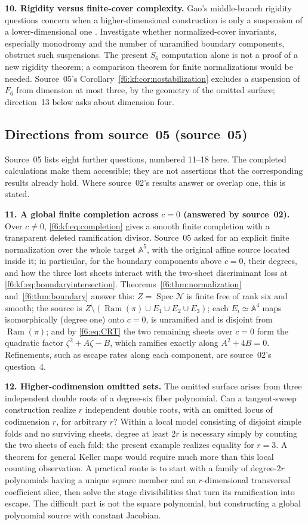 \documentclass[11pt,a4paper]{article}
\theoremstyle{definition}
\newcommand{\A}{\mathbb A}
\newcommand{\Spec}{\operatorname{Spec}}
\newcommand{\Ram}{\operatorname{Ram}}
\newcommand{\normal}{\mathcal N}
\newcommand{\src}[1]{\textup{(source~#1)}}
\begin{document}
\textbf{10. Rigidity versus finite-cover complexity.} Gao's middle-branch
rigidity questions concern when a higher-dimensional construction is
only a suspension of a lower-dimensional one \cite[\S4.5.2]{Gao}.
Investigate whether normalized-cover invariants, especially monodromy
and the number of unramified boundary components, obstruct such
suspensions. The present $S_6$ computation alone is not a proof of a
new rigidity theorem; a comparison theorem for finite normalizations
would be needed. Source~05's Corollary~\ref{f6:kf:cor:nostabilization}
excludes a suspension of $F_6$ from dimension at most three, by the
geometry of the omitted surface; direction~13 below asks about dimension
four.

\subsection{Directions from source~05 \src{05}}
\label{f6:kf:sec:future}
Source~05 lists eight further questions, numbered 11--18 here. The completed
calculations make them accessible; they are not assertions that the
corresponding results already hold. Where source~02's results answer or
overlap one, this is stated.

\textbf{11. A global finite completion across $c=0$ (answered by
source~02).} Over $c\ne0$, \eqref{f6:kf:eq:completion} gives a smooth finite
completion with a transparent deleted ramification divisor. Source~05 asked
for an explicit finite normalization over the whole target $\A^5$, with the
original affine source located inside it; in particular, for the boundary
components above $c=0$, their degrees, and how the three lost sheets interact
with the two-sheet discriminant loss at \eqref{f6:kf:eq:boundaryintersection}.
Theorems~\ref{f6:thm:normalization} and~\ref{f6:thm:boundary} answer this:
$Z=\Spec\normal$ is finite free of rank six and smooth; the source is
$Z\setminus(\Ram(\pi)\cup E_1\cup E_2\cup E_3)$; each $E_i\simeq\A^4$ maps
isomorphically (degree one) onto $c=0$, is unramified and is disjoint from
$\Ram(\pi)$; and by \eqref{f6:eq:CRT} the two remaining sheets over $c=0$
form the quadratic factor $\zeta^2+A\zeta-B$, which ramifies exactly along
$A^2+4B=0$. Refinements, such as escape rates along each component, are
source~02's question~4.

\textbf{12. Higher-codimension omitted sets.} The omitted surface arises from
three independent double roots of a degree-six fiber polynomial. Can a
tangent-sweep construction realize $r$ independent double roots, with an
omitted locus of codimension $r$, for arbitrary $r$? Within a local model
consisting of disjoint simple folds and no surviving sheets, degree at least
$2r$ is necessary simply by counting the two sheets of each fold; the present
example realizes equality for $r=3$. A theorem for general Keller maps would
require much more than this local counting observation. A practical route is
to start with a family of degree-$2r$ polynomials having a unique square
member and an $r$-dimensional transversal coefficient slice, then solve the
stage divisibilities that turn its ramification into escape. The difficult
part is not the square polynomial, but constructing a global polynomial
source with constant Jacobian.
\end{document}
